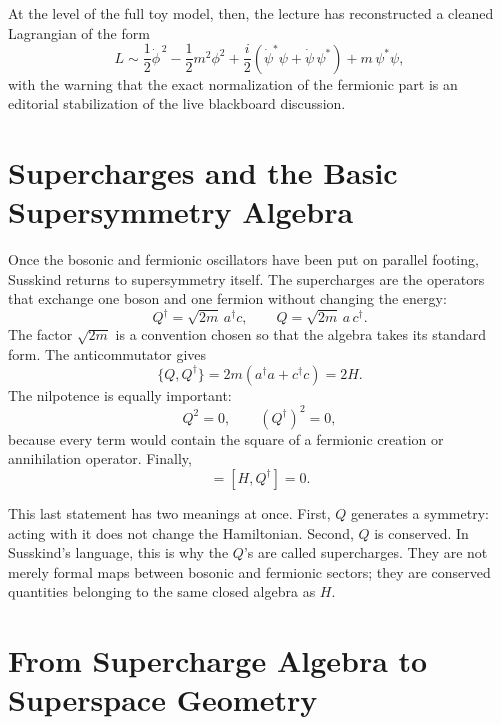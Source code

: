 At the level of the full toy model, then, the lecture has reconstructed a cleaned Lagrangian of the form
\begin{equation}
L \sim \frac{1}{2}\dot{\phi}^{\,2} - \frac{1}{2}m^2\phi^2
+ \frac{i}{2}\left(\dot\psi^\ast \psi + \dot\psi\,\psi^\ast\right)
+ m\,\psi^\ast\psi,
\end{equation}
with the warning that the exact normalization of the fermionic part is an editorial stabilization of the live blackboard discussion.

\section{Supercharges and the Basic Supersymmetry Algebra}

Once the bosonic and fermionic oscillators have been put on parallel footing, Susskind returns to supersymmetry itself. The supercharges are the operators that exchange one boson and one fermion without changing the energy:
\begin{equation}
Q^\dagger = \sqrt{2m}\,a^\dagger c,
\qquad
Q = \sqrt{2m}\,a\,c^\dagger.
\end{equation}
The factor \(\sqrt{2m}\) is a convention chosen so that the algebra takes its standard form. The anticommutator gives
\begin{equation}
\{Q,Q^\dagger\} = 2m\left(a^\dagger a + c^\dagger c\right) = 2H.
\end{equation}
The nilpotence is equally important:
\begin{equation}
Q^2 = 0,
\qquad
(Q^\dagger)^2 = 0,
\end{equation}
because every term would contain the square of a fermionic creation or annihilation operator. Finally,
\begin{equation}
[H,Q]=[H,Q^\dagger]=0.
\end{equation}

This last statement has two meanings at once. First, \(Q\) generates a symmetry: acting with it does not change the Hamiltonian. Second, \(Q\) is conserved. In Susskind's language, this is why the \(Q\)'s are called supercharges. They are not merely formal maps between bosonic and fermionic sectors; they are conserved quantities belonging to the same closed algebra as \(H\).

\section{From Supercharge Algebra to Superspace Geometry}

